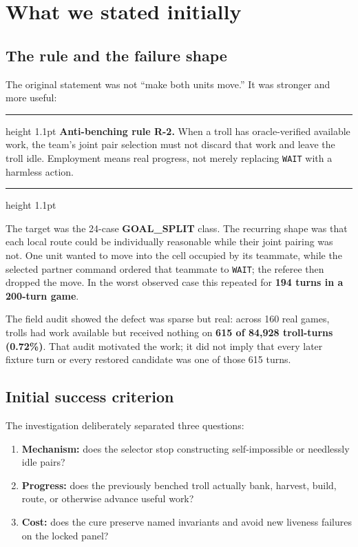 \documentclass[10pt,a4paper]{article}
\newcommand{\code}[1]{\texttt{#1}}
\newcommand{\term}[1]{\textcolor{accent}{\textbf{#1}}}
\newenvironment{BlueBox}
  {\par\medskip\noindent\begin{minipage}{\textwidth}\color{accent}\hrule height 1.1pt\vspace{5pt}\color{ink}}
  {\vspace{2pt}\color{accent}\hrule height 1.1pt\end{minipage}\par\medskip}
\begin{document}
\section{What we stated initially}

\subsection{The rule and the failure shape}

The original statement was not ``make both units move.'' It was stronger and more useful:

\begin{BlueBox}
\textbf{Anti-benching rule R-2.} When a troll has oracle-verified available work, the team's joint
pair selection must not discard that work and leave the troll idle. Employment means real progress,
not merely replacing \code{WAIT} with a harmless action.
\end{BlueBox}

The target was the 24-case \term{GOAL\_SPLIT} class. The recurring shape was that each local route
could be individually reasonable while their joint pairing was not. One unit wanted to move into
the cell occupied by its teammate, while the selected partner command ordered that teammate to
\code{WAIT}; the referee then dropped the move. In the worst observed case this repeated for
\textbf{194 turns in a 200-turn game}.

The field audit showed the defect was sparse but real: across 160 real games, trolls had work
available but received nothing on \textbf{615 of 84,928 troll-turns (0.72\%)}. That audit motivated
the work; it did not imply that every later fixture turn or every restored candidate was one of
those 615 turns.

\subsection{Initial success criterion}

The investigation deliberately separated three questions:

\begin{enumerate}
  \item \textbf{Mechanism:} does the selector stop constructing self-impossible or needlessly idle
        pairs?
  \item \textbf{Progress:} does the previously benched troll actually bank, harvest, build, route,
        or otherwise advance useful work?
  \item \textbf{Cost:} does the cure preserve named invariants and avoid new liveness failures on
        the locked panel?
\end{enumerate}
\end{document}
